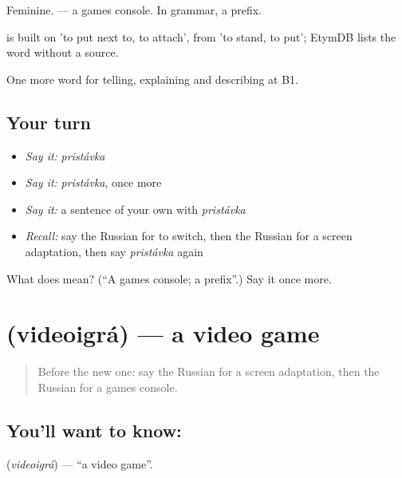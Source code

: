 Feminine. \emph{ } — a games console. In grammar, a prefix.

\begin{cousinweb}
\emph{} is built on \emph{} 'to put next to, to attach', from \emph{} 'to stand, to put'; EtymDB lists the word without a source.
\end{cousinweb}

\begin{grammarlens}[title={What you've built}]
One more word for telling, explaining and describing at B1.
\end{grammarlens}

\subsection*{Your turn}
\begin{itemize}
\raggedright
  \item \emph{Say it:} \emph{pristávka}
  \item \emph{Say it:} \emph{pristávka}, once more
  \item \emph{Say it:} a sentence of your own with \emph{pristávka}
  \item \emph{Recall:} say the Russian for to switch, then the Russian for a screen adaptation, then say \emph{pristávka} again
\end{itemize}

\begin{tcolorbox}[breakable,colback=teal!4,colframe=teal!35!black,title={Before you move on}]
What does  mean? (\textquotedblleft{}A games console; a prefix\textquotedblright{}.) Say it once more.
\end{tcolorbox}
\section[\texorpdfstring{\ru{видеоигра} (videoigrá)}{видеоигра (videoigrá)}]{ (videoigrá) — a video game}

\label{lesson:RU-C528-videoigra}



\begin{quote}
Before the new one: say the Russian for a screen adaptation, then the Russian for a games console.
\end{quote}

\subsection*{You'll want to know: }
\textbf{} (\emph{videoigrá}) — \textquotedblleft{}a video game\textquotedblright{}.


